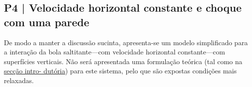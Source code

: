 \subsection{P4 | Velocidade horizontal constante e choque com uma parede}
\label{subsec:P4}

\noindent De modo a manter a discussão sucinta, apresenta-se um modelo simplificado para a interação da bola saltitante---com velocidade horizontal constante---com superfícies verticais. Não será apresentada uma formulação teórica (tal como na \hyperref[sec:intro]{secção intro- dutória}) para este sistema, pelo que são expostas condições mais relaxadas.

\vspace{-1em}
